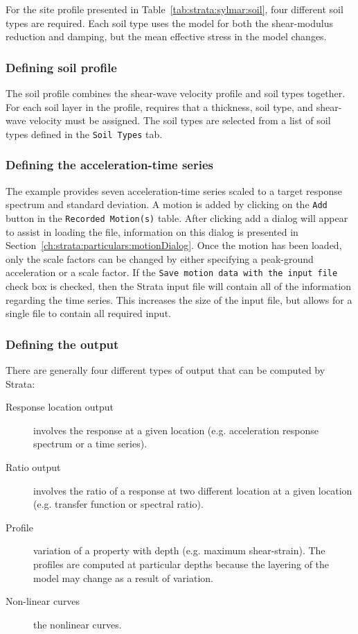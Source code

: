 \documentclass[11pt]{report}
\begin{document}
For the site profile presented in Table~\ref{tab:strata:sylmar:soil}, four different soil types are
required.  Each soil type uses the \citet{darendeli:01} model for both the shear-modulus reduction
and damping, but the mean effective stress in the model changes.

\subsubsection{Defining soil profile}
The soil profile combines the shear-wave velocity profile and soil types together.  For each soil
layer in the profile, requires that a thickness, soil type, and shear-wave velocity must be
assigned.  The soil types are selected from a list of soil types defined in the \texttt{Soil Types}
tab.

\subsubsection{Defining the acceleration-time series}
The example provides seven acceleration-time series scaled to a target response spectrum and
standard deviation.  A motion is added by clicking on the \texttt{Add} button in the
\texttt{Recorded Motion(s)} table.  After clicking add a dialog will appear to assist in loading the
file, information on this dialog is presented in Section~\ref{ch:strata:particulars:motionDialog}.
Once the motion has been loaded, only the scale factors can be changed by either specifying a
peak-ground acceleration or a scale factor.  If the \texttt{Save motion data with the input file}
check box is checked, then the Strata input file will contain all of the information regarding the
time series.  This increases the size of the input file, but allows for a single file to contain all
required input.

\subsubsection{Defining the output}
There are generally four different types of output that can be computed by Strata:
\begin{description}
  \item[Response location output] involves the response at a given location (e.g. acceleration
	response spectrum or a time series).
  \item[Ratio output] involves the ratio of a response at two different location at a given location
	(e.g. transfer function or spectral ratio).
  \item[Profile] variation of a property with depth (e.g. maximum shear-strain).  The profiles are
	computed at particular depths because the layering of the model may change as a result of variation. 
  \item[Non-linear curves] the nonlinear curves.
\end{description}
\end{document}
